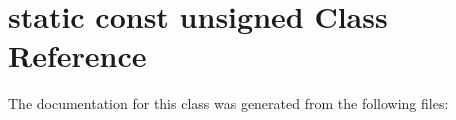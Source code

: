 \hypertarget{classstatic_01const_01unsigned}{}\section{static const unsigned Class Reference}
\label{classstatic_01const_01unsigned}


The documentation for this class was generated from the following files\+: